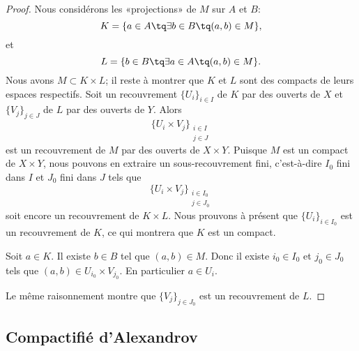 \begin{proof}
	Nous considérons les «projections» de \( M\) sur \( A\) et \( B\):
	\begin{equation}
		K=\{ a\in A\tq \exists b\in B\tq (a,b)\in M \},
	\end{equation}
	et
	\begin{equation}
		L=\{ b\in B\tq \exists a\in A\tq (a,b)\in M \}.
	\end{equation}
	Nous avons \( M\subset K\times L\); il reste à montrer que \( K\) et \( L\) sont des compacts de leurs espaces respectifs. Soit un recouvrement \( \{ U_i \}_{i\in I} \) de \( K\) par des ouverts de \( X\) et \( \{ V_j \}_{j\in J}\) de \( L\) par des ouverts de \( Y\). Alors
	\begin{equation}
		\{ U_i\times  V_j \}_{\substack{i\in I\\j\in J}}
	\end{equation}
	est un recouvrement de \( M\) par des ouverts de \( X\times Y\). Puisque \( M\) est un compact de \( X\times Y\), nous pouvons en extraire un sous-recouvrement fini, c'est-à-dire \( I_0\) fini dans \( I\) et \( J_0\) fini dans \( J\) tels que
	\begin{equation}
		\{ U_i\times  V_j \}_{\substack{i\in I_0\\j\in J_0}}
	\end{equation}
	soit encore un recouvrement de \( K\times L\). Nous prouvons à présent que \( \{ U_i \}_{i\in I_0}\) est un recouvrement de \( K\), ce qui montrera que \( K\) est un compact.

	Soit \( a\in K\). Il existe \( b\in B\) tel que \( (a,b)\in M\). Donc il existe \( i_0\in I_0\) et \( j_0\in J_0\) tels que \( (a,b)\in U_{i_0}\times V_{j_0}\). En particulier \( a\in U_i\).

	Le même raisonnement montre que \( \{ V_j \}_{j\in J_0}\) est un recouvrement de \( L\).
\end{proof}

\subsection{Compactifié d'Alexandrov}

